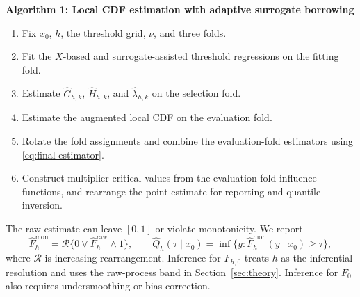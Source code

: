 \begin{procedurebox}
\textbf{Algorithm 1: Local CDF estimation with adaptive surrogate borrowing}
\begin{enumerate}[leftmargin=1.6em,itemsep=0.2em,topsep=0.4em]
\item Fix \(x_0\), \(h\), the threshold grid, \(\nu\), and three folds.
\item Fit the \(X\)-based and surrogate-assisted threshold regressions on the fitting fold.
\item Estimate \(\widehat G_{h,k}\), \(\widehat H_{h,k}\), and \(\widehat\lambda_{h,k}\) on the selection fold.
\item Estimate the augmented local CDF on the evaluation fold.
\item Rotate the fold assignments and combine the evaluation-fold estimators using \eqref{eq:final-estimator}.
\item Construct multiplier critical values from the evaluation-fold influence
functions, and rearrange the point estimate for reporting and quantile
inversion.
\end{enumerate}
\end{procedurebox}

The raw estimate can leave \([0,1]\) or violate monotonicity. We report
\[
\widehat F_h^{\mathrm{mon}}
=
\mathcal R\{0\vee\widehat F_h^{\mathrm{raw}}\wedge1\},
\qquad
\widehat Q_h(\tau\mid x_0)
=
\inf\{y:\widehat F_h^{\mathrm{mon}}(y\mid x_0)\ge\tau\},
\]
where \(\mathcal R\) is increasing rearrangement. Inference for \(F_{h,0}\)
treats \(h\) as the inferential resolution and uses the raw-process band in
Section~\ref{sec:theory}. Inference for \(F_0\) also requires undersmoothing or
bias correction.
